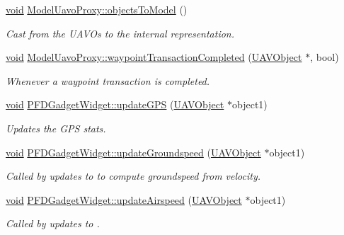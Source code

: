 \begin{DoxyCompactItemize}
\hyperlink{group___u_a_v_objects_plugin_ga444cf2ff3f0ecbe028adce838d373f5c}{void} \hyperlink{group___o_p_map_plugin_gadf2e7f7ca1a0ae5d380c107e7dbf9132}{\-Model\-Uavo\-Proxy\-::objects\-To\-Model} ()
\begin{DoxyCompactList}\small\item\em \-Cast from the \-U\-A\-V\-Os to the internal representation. \end{DoxyCompactList}\item 
\hyperlink{group___u_a_v_objects_plugin_ga444cf2ff3f0ecbe028adce838d373f5c}{void} \hyperlink{group___o_p_map_plugin_ga428d73f0e25b47749d707e5c6bd5d34f}{\-Model\-Uavo\-Proxy\-::waypoint\-Transaction\-Completed} (\hyperlink{class_u_a_v_object}{\-U\-A\-V\-Object} $\ast$, bool)
\begin{DoxyCompactList}\small\item\em \-Whenever a waypoint transaction is completed. \end{DoxyCompactList}\item 
\hyperlink{group___u_a_v_objects_plugin_ga444cf2ff3f0ecbe028adce838d373f5c}{void} \hyperlink{group___o_p_map_plugin_ga469cc6075704bce32507f7561422a3ff}{\-P\-F\-D\-Gadget\-Widget\-::update\-G\-P\-S} (\hyperlink{class_u_a_v_object}{\-U\-A\-V\-Object} $\ast$object1)
\begin{DoxyCompactList}\small\item\em \-Updates the \-G\-P\-S stats. \end{DoxyCompactList}\item 
\hyperlink{group___u_a_v_objects_plugin_ga444cf2ff3f0ecbe028adce838d373f5c}{void} \hyperlink{group___o_p_map_plugin_gafcdd8249475fe6543b75829cdc19b279}{\-P\-F\-D\-Gadget\-Widget\-::update\-Groundspeed} (\hyperlink{class_u_a_v_object}{\-U\-A\-V\-Object} $\ast$object1)
\begin{DoxyCompactList}\small\item\em \-Called by updates to  to compute groundspeed from velocity. \end{DoxyCompactList}\item 
\hyperlink{group___u_a_v_objects_plugin_ga444cf2ff3f0ecbe028adce838d373f5c}{void} \hyperlink{group___o_p_map_plugin_gac2bff4b3471fe9c088578d0d274716c6}{\-P\-F\-D\-Gadget\-Widget\-::update\-Airspeed} (\hyperlink{class_u_a_v_object}{\-U\-A\-V\-Object} $\ast$object1)
\begin{DoxyCompactList}\small\item\em \-Called by updates to . \end{DoxyCompactList}\item 

\end{DoxyCompactItemize}
